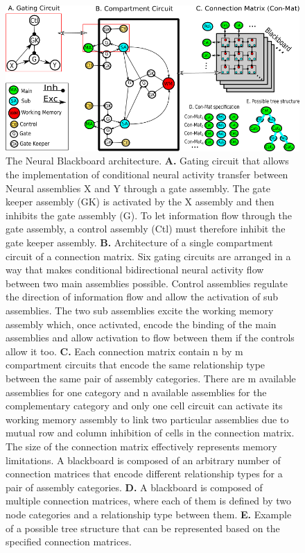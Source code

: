 \documentclass[10pt]{article}
\begin{document}
\begin{figure}[h!]
  \begin{center}
    \includegraphics[width=1.00\columnwidth]{figures/gating_circuit3/gating_circuit3}
    \caption{The Neural Blackboard architecture. \textbf{A.} Gating
      circuit that allows the implementation of conditional neural
      activity transfer between Neural assemblies X and Y through a
      gate assembly. The gate keeper assembly (GK) is activated by the
      X assembly and then inhibits the gate assembly (G). To let
      information flow through the gate assembly, a control assembly
      (Ctl) must therefore inhibit the gate keeper assembly.
      \textbf{B.} Architecture of a single compartment circuit of a
      connection matrix. Six gating circuits are arranged in a way
      that makes conditional bidirectional neural activity flow
      between two main assemblies possible. Control assemblies
      regulate the direction of information flow and allow the
      activation of sub assemblies. The two sub assemblies excite the
      working memory assembly which, once activated, encode the binding
      of the main assemblies and allow activation to flow between them
      if the controls allow it too. \textbf{C.} Each connection matrix contain
      n by m compartment circuits that encode the same relationship
      type between the same pair of assembly categories. There are m
      available assemblies for one category and n available assemblies
      for the complementary category and only one cell circuit can
      activate its working memory assembly to link two particular
      assemblies due to mutual row and column inhibition of cells in
      the connection matrix. The size of the connection matrix
      effectively represents memory limitations. A blackboard is
      composed of an arbitrary number of connection matrices that
      encode different relationship types for a pair of assembly
      categories. \textbf{D.} A blackboard is composed of multiple connection
      matrices, where each of them is defined by two node categories
      and a relationship type between them. \textbf{E.} Example of a possible
      tree structure that can be represented
      based on the specified connection matrices.
    }
      \label{Blackboard}
  \end{center}
\end{figure}
\end{document}
